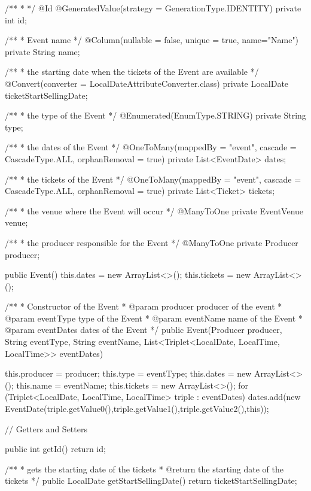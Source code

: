 \begin{prompt}
{    /**
     * 
     */
    @Id @GeneratedValue(strategy = GenerationType.IDENTITY)
    private int id;
  
    /**
     * Event name
     */
    @Column(nullable = false, unique = true, name="Name")
    private String name;
  
    /**
     * the starting date when the tickets of the Event are available
     */
    @Convert(converter = LocalDateAttributeConverter.class)
    private LocalDate ticketStartSellingDate;
  
    /**
     * the type of the Event
     */
    @Enumerated(EnumType.STRING)
    private String type;
  
    /**
     * the dates of the Event
     */
    @OneToMany(mappedBy = "event", cascade = CascadeType.ALL, orphanRemoval = true)
    private List<EventDate> dates;
  
    /**
     * the tickets of the Event
     */
    @OneToMany(mappedBy = "event", cascade = CascadeType.ALL, orphanRemoval = true)
    private List<Ticket> tickets;
  
    /**
     * the venue where the Event will occur 
     */
    @ManyToOne
    private EventVenue venue;
  
    /**
     * the producer responsible for the Event
     */
    @ManyToOne
    private Producer producer;
  
  
    public Event() {
      this.dates = new ArrayList<>();
      this.tickets = new ArrayList<>();
    }
    
    /**
     * Constructor of the Event
     * @param producer producer of the event
     * @param eventType type of the Event
     * @param eventName name of the Event
     * @param eventDates dates of the Event
     */
    public Event(Producer producer, String eventType, String eventName, List<Triplet<LocalDate, LocalTime, LocalTime>> eventDates) {
  
  
      this.producer = producer;
      this.type = eventType;
      this.dates = new ArrayList<>();
      this.name = eventName;
      this.tickets = new ArrayList<>();
      for (Triplet<LocalDate, LocalTime, LocalTime> triple : eventDates) {
        dates.add(new EventDate(triple.getValue0(),triple.getValue1(),triple.getValue2(),this));
      }
    }
    
    
    // Getters and Setters
    
    public int getId() {
      return id;
    }
    
    /**
     * gets the starting date of the tickets
     * @return the starting date of the tickets
     */
    public LocalDate getStartSellingDate() {
      return ticketStartSellingDate;
    }
  
}
\end{prompt}
